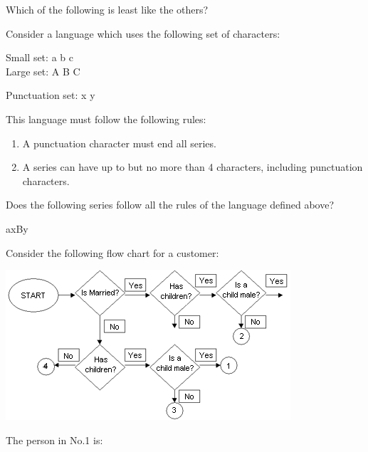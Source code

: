 \documentclass[11pt]{examdesign}
\begin{document}


\begin{multiplechoice}[title={Programming Apptitude},suppressprefix=no,rearrange=no]
\begin{question}
Which of the following is least like the others?
\end{question}

\begin{question}
Consider a language which uses the following set of characters:

Small set: { a b c }\\
Large set: { A B C }

Punctuation set: { x y }

This language must follow the following rules:
\begin{enumerate}
  \item A punctuation character must end all series. 
  \item A series can have up to but no more than 4 characters, including punctuation characters. 
\end{enumerate}    

Does the following series follow all the rules of the language defined above?

axBy
    
\end{question}

\begin{question}
Consider the following flow chart for a customer:
\begin{center}
\includegraphics[scale=0.7]{apt}
\end{center}
The person in No.1 is:
\end{question}


\end{multiplechoice}
\end{document}
